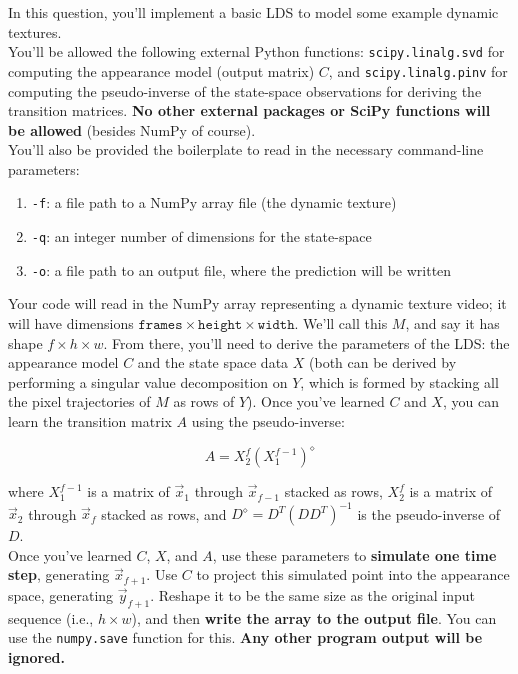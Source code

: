 \documentclass[paper=a4, fontsize=11pt]{scrartcl} %
\numberwithin{figure}{section} %
\numberwithin{table}{section} %
\begin{document}
In this question, you'll implement a basic LDS to model some example dynamic textures. \\

You'll be allowed the following external Python functions: \texttt{scipy.linalg.svd} for computing the appearance model (output matrix) $C$, and \texttt{scipy.linalg.pinv} for computing the pseudo-inverse of the state-space observations for deriving the transition matrices. \textbf{No other external packages or SciPy functions will be allowed} (besides NumPy of course). \\

You'll also be provided the boilerplate to read in the necessary command-line parameters:

\begin{enumerate}
	\item \texttt{-f}: a file path to a NumPy array file (the dynamic texture)
	\item \texttt{-q}: an integer number of dimensions for the state-space
	\item \texttt{-o}: a file path to an output file, where the prediction will be written
\end{enumerate}

Your code will read in the NumPy array representing a dynamic texture video; it will have dimensions $\texttt{frames} \times \texttt{height} \times \texttt{width}$. We'll call this $M$, and say it has shape $f \times h \times w$. From there, you'll need to derive the parameters of the LDS: the appearance model $C$ and the state space data $X$ (both can be derived by performing a singular value decomposition on $Y$, which is formed by stacking all the pixel trajectories of $M$ as rows of $Y$). Once you've learned $C$ and $X$, you can learn the transition matrix $A$ using the pseudo-inverse:

$$
A = X_2^f (X_1^{f - 1})^{\diamond}
$$

where $X_1^{f - 1}$ is a matrix of $\vec{x}_1$ through $\vec{x}_{f - 1}$ stacked as rows, $X_2^f$ is a matrix of $\vec{x}_2$ through $\vec{x}_f$ stacked as rows, and $D^{\diamond} = D^T(DD^T)^{-1}$ is the pseudo-inverse of $D$. \\

Once you've learned $C$, $X$, and $A$, use these parameters to \textbf{simulate one time step}, generating $\vec{x}_{f + 1}$. Use $C$ to project this simulated point into the appearance space, generating $\vec{y}_{f + 1}$. Reshape it to be the same size as the original input sequence (i.e., $h \times w$), and then \textbf{write the array to the output file}. You can use the \texttt{numpy.save} function for this. \textbf{Any other program output will be ignored.} \\
\end{document}
